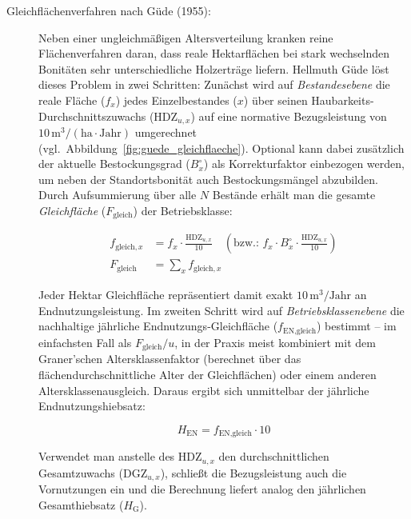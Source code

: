 \documentclass[twocolumn, paper=a4, fontsize=10pt]{scrartcl}
\begin{document}
\begin{description}
\item[Gleichflächenverfahren nach Güde (1955):] Neben einer ungleichmäßigen Altersverteilung kranken reine Flächenverfahren daran, dass reale Hektarflächen bei stark wechselnden Bonitäten sehr unterschiedliche Holzerträge liefern. Hellmuth Güde löst dieses Problem in zwei Schritten: Zunächst wird auf \emph{Bestandesebene} die reale Fläche ($f_x$) jedes Einzelbestandes ($x$) über seinen Haubarkeits-Durchschnittszuwachs ($\text{HDZ}_{u,x}$) auf eine normative Bezugsleistung von $10\,\text{m}^3/(\text{ha}\cdot\text{Jahr})$ umgerechnet (vgl.\ Abbildung~\ref{fig:guede_gleichflaeche}). Optional kann dabei zusätzlich der aktuelle Bestockungsgrad ($B^\circ_x$) als Korrekturfaktor einbezogen werden, um neben der Standortsbonität auch Bestockungsmängel abzubilden. Durch Aufsummierung über alle $N$ Bestände erhält man die gesamte \emph{Gleichfläche} ($F_{\text{gleich}}$) der Betriebsklasse:
  
\begin{align}
f_{\text{gleich},x} &= f_x \cdot \frac{\text{HDZ}_{u,x}}{10} \quad \left(\text{bzw.: } f_x \cdot B^\circ_x \cdot \frac{\text{HDZ}_{u,x}}{10}\right) \\
F_{\text{gleich}} &= \sum_x f_{\text{gleich},x}
\end{align}

Jeder Hektar Gleichfläche repräsentiert damit exakt $10\,\text{m}^3/\text{Jahr}$ an Endnutzungsleistung. Im zweiten Schritt wird auf \emph{Betriebsklassenebene} die nachhaltige jährliche Endnutzungs-Gleichfläche ($f_{\text{EN,gleich}}$) bestimmt -- im einfachsten Fall als $F_{\text{gleich}} / u$, in der Praxis meist kombiniert mit dem Graner'schen Altersklassenfaktor (berechnet über das flächendurchschnittliche Alter der Gleichflächen) oder einem anderen Altersklassenausgleich. Daraus ergibt sich unmittelbar der jährliche Endnutzungshiebsatz:

\begin{equation}
H_{\text{EN}} = f_{\text{EN,gleich}} \cdot 10
\end{equation}

Verwendet man anstelle des $\text{HDZ}_{u,x}$ den durchschnittlichen Gesamtzuwachs ($\text{DGZ}_{u,x}$), schließt die Bezugsleistung auch die Vornutzungen ein und die Berechnung liefert analog den jährlichen Gesamthiebsatz ($H_{\text{G}}$).\\
\end{description}
\end{document}

